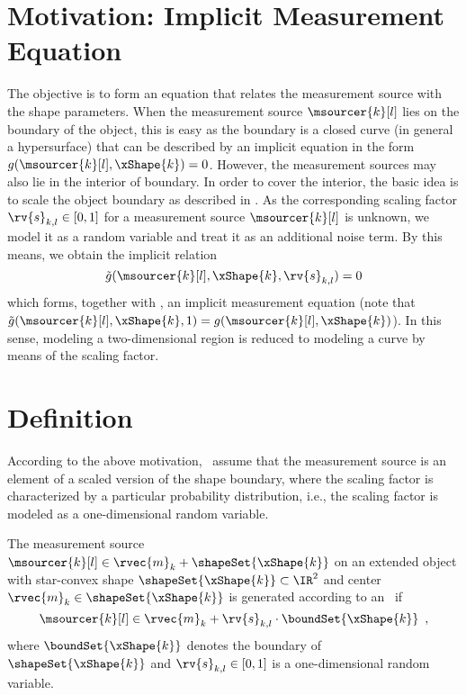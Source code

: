 \documentclass[preprint,1p,11pt]{ISAS_IR}
\newcommand{\placeFig}[1]{}
\begin{document}
\section{Motivation: Implicit  Measurement Equation}\label{sec:rhmmotivation}
The objective is to  form  an equation that  relates the measurement source with the shape parameters.
When the measurement source $\msourcer{k}[l]$ lies on the boundary of the object, this is easy as
the boundary is a closed curve (in general a hypersurface) that can be described by an implicit equation in the form  $g(\msourcer{k}[l], \xShape{k})  =  0$.
However, the measurement sources may  also lie in the interior of boundary. In order to cover the interior, the basic idea is to scale the object boundary as described in  .
As the corresponding scaling factor $\rv{s}_{k,l} \in [0,1]$ for a measurement source   $\msourcer{k}[l]$ is unknown, we model it as a random variable and treat it as an additional noise term. By this means, we obtain the implicit relation 
\begin{equation}\label{eqn:implicitsourceeqn}
\tilde{g}(\msourcer{k}[l], \xShape{k}, \rv{s}_{k,l})  =  0
\end{equation}
which forms, together with  ,    an implicit measurement equation (note that $\tilde{g}(\msourcer{k}[l], \xShape{k},1)=g(\msourcer{k}[l], \xShape{k})$). 
In this sense,  modeling a two-dimensional region is reduced to modeling a curve by means of the scaling factor. 


\placeFig{3}

\section{Definition}
According to the above motivation,  \rhms\ assume that the measurement source is  an element of a  scaled version of the  shape boundary, where the scaling factor is characterized by a particular  probability distribution, i.e., the scaling factor is modeled as a one-dimensional random variable.
 
\begin{Definition}\label{def:rhm}
The measurement source $\msourcer{k}[l] \in \rvec{m}_k + \shapeSet{\xShape{k}}$ on an extended object with star-convex shape $\shapeSet{\xShape{k}} \subset \IR^2$ and center  $\rvec{m}_k \in \shapeSet{\xShape{k}}$ is generated according to an \rhm\ if  
   $$ \msourcer{k}[l] \in \rvec{m}_k+\rv{s}_{k,l}\cdot \boundSet{\xShape{k}}  \enspace ,$$ where $\boundSet{\xShape{k}}$ denotes the boundary of $\shapeSet{\xShape{k}}$    and     $\rv{s}_{k,l} \in [0, 1]$ is a  one-dimensional random variable.
\end{Definition}
 
\end{document}
